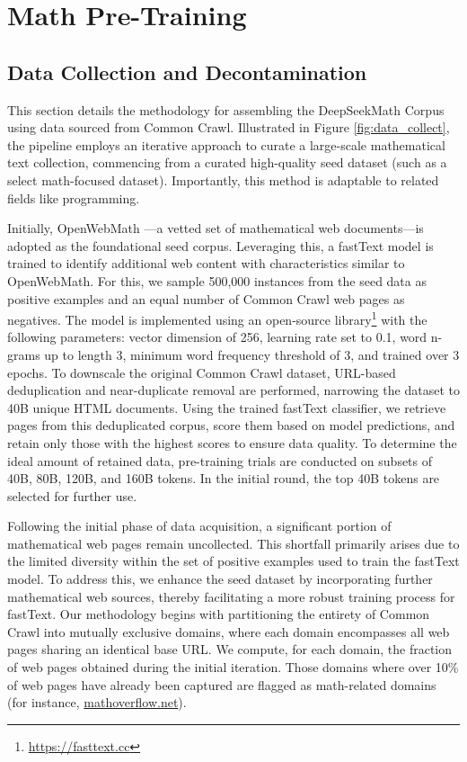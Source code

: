\section{Math Pre-Training}

\subsection{Data Collection and Decontamination}
This section details the methodology for assembling the DeepSeekMath Corpus using data sourced from Common Crawl. Illustrated in Figure \ref{fig:data_collect}, the pipeline employs an iterative approach to curate a large-scale mathematical text collection, commencing from a curated high-quality seed dataset (such as a select math-focused dataset). Importantly, this method is adaptable to related fields like programming.

Initially, OpenWebMath \citep{openwebmath}—a vetted set of mathematical web documents—is adopted as the foundational seed corpus. Leveraging this, a fastText model \citep{joulin2016fasttext} is trained to identify additional web content with characteristics similar to OpenWebMath. For this, we sample 500,000 instances from the seed data as positive examples and an equal number of Common Crawl web pages as negatives. The model is implemented using an open-source library\footnote{\url{https://fasttext.cc}} with the following parameters: vector dimension of 256, learning rate set to 0.1, word n-grams up to length 3, minimum word frequency threshold of 3, and trained over 3 epochs. To downscale the original Common Crawl dataset, URL-based deduplication and near-duplicate removal are performed, narrowing the dataset to 40B unique HTML documents. Using the trained fastText classifier, we retrieve pages from this deduplicated corpus, score them based on model predictions, and retain only those with the highest scores to ensure data quality. To determine the ideal amount of retained data, pre-training trials are conducted on subsets of 40B, 80B, 120B, and 160B tokens. In the initial round, the top 40B tokens are selected for further use.

Following the initial phase of data acquisition, a significant portion of mathematical web pages remain uncollected. This shortfall primarily arises due to the limited diversity within the set of positive examples used to train the fastText model. To address this, we enhance the seed dataset by incorporating further mathematical web sources, thereby facilitating a more robust training process for fastText. Our methodology begins with partitioning the entirety of Common Crawl into mutually exclusive domains, where each domain encompasses all web pages sharing an identical base URL. We compute, for each domain, the fraction of web pages obtained during the initial iteration. Those domains where over 10\% of web pages have already been captured are flagged as math-related domains (for instance, \url{mathoverflow.net}). 

